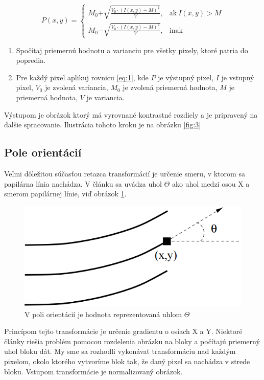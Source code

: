 \documentclass[11pt,a4paper]{article}
\begin{document}
 \begin{equation}
P(x,y) =
\begin{cases}
M_0 \boldsymbol {+} \sqrt{\frac{V_0 \cdot (I(x,y) -M )^2 }{V}}, & \text{ak}\ I(x,y)>M \\
M_0 \boldsymbol {-} \sqrt{\frac{V_0 \cdot (I(x,y) -M )^2 }{V}}, & \text{inak}
\end{cases}
\label{eq:1}
\end{equation}

\begin{enumerate}
	\item Spočítaj priemernú hodnotu a varianciu pre všetky pixely, ktoré patria do popredia.
	\item Pre každý pixel aplikuj rovnicu \ref{eq:1}, kde $P$ je výstupný pixel, $I$ je vstupný pixel, $V_0$ je zvolená variancia, $M_0$ je zvolená priemerná hodnota,  $M$ je priemerná hodnota,  $V$ je variancia.
\end{enumerate}

Výstupom je obrázok ktorý má vyrovnané kontrastné rozdiely a je pripravený na dalšie spracovanie.
Ilustrácia tohoto kroku je na obrázku \ref{fig:3}














\subsection*{Pole orientácií}
Veľmi dôležitou súčasťou retazca transformácií je určenie smeru, v ktorom sa papilárna línia nachádza. V článku \cite{thai} sa uvádza uhol $\Theta$ ako uhol medzi osou X a smerom papilárnej línie, viď obrázok \ref{fig:4}.

\begin{figure}[h]
	\centering
	\includegraphics[width=.4\linewidth]{images/Screenshot_9}
	\caption{V poli orientácií je hodnota reprezentovaná uhlom $\Theta$}
	\label{fig:4}
\end{figure}

Princípom tejto transformácie je určenie gradientu o osiach X a Y. Niektoré články riešia problém pomocou rozdelenia obrázku na bloky a počítajú priemerný uhol bloku dát. My sme sa rozhodli vykonávať transformáciu nad každým pixelom, okolo ktorého vytvoríme blok tak, že daný pixel sa nachádza v strede bloku. Vstupom transformácie je normalizovaný obrázok.
\end{document}
